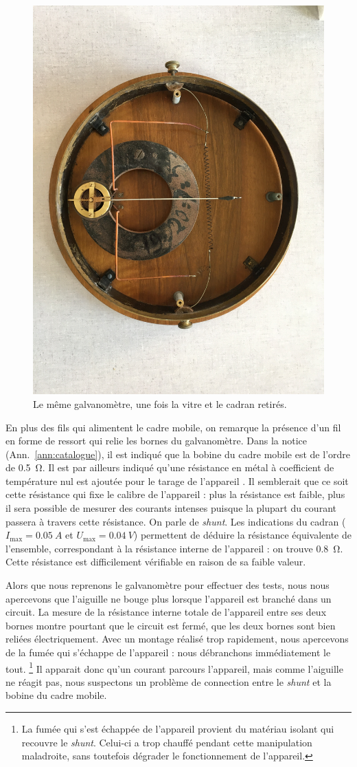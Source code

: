 \documentclass[12pt,a4paper,fleqn]{article}
\begin{document}
\begin{figure}[htbp]
    \center
    \includegraphics[height=300 pt, trim=500 100 600 200, clip]{images/IMG_4037.JPG}
    \caption{Le même galvanomètre, une fois la vitre et le cadran retirés.}
    \label{fig:galva_amp_int}
\end{figure}

En plus des fils qui alimentent le cadre mobile, on remarque la présence d'un fil en forme de ressort qui relie les bornes du galvanomètre.
Dans la notice (Ann.~\ref{ann:catalogue}), il est indiqué que la bobine du cadre mobile est de l'ordre de \SI{0.5}{\ohm}.
Il est par ailleurs indiqué qu'\og une résistance en métal à coefficient de température nul est ajoutée pour le tarage de l'appareil \fg{}.
Il semblerait que ce soit cette résistance qui fixe le calibre de l'appareil : plus la résistance est faible, plus il sera possible de mesurer des courants intenses puisque la plupart du courant passera à travers cette résistance.
On parle de \emph{shunt}.
Les indications du cadran ($I_\mathrm{max}=\SI{0.05}{A}$ et $U_\mathrm{max}=\SI{0.04}{V}$) permettent de déduire la résistance équivalente de l'ensemble, correspondant à la résistance interne de l'appareil : on trouve \SI{0.8}{\ohm}.
Cette résistance est difficilement vérifiable en raison de sa faible valeur.

Alors que nous reprenons le galvanomètre pour effectuer des tests, nous nous apercevons que l'aiguille ne bouge plus lorsque l'appareil est branché dans un circuit.
La mesure de la résistance interne totale de l'appareil entre ses deux bornes montre pourtant que le circuit est fermé, que les deux bornes sont bien reliées électriquement.
Avec un montage réalisé trop rapidement, nous apercevons de la fumée qui s'échappe de l'appareil : nous débranchons immédiatement le tout.
\footnote{La fumée qui s'est échappée de l'appareil provient du matériau isolant qui recouvre le \emph{shunt}.
Celui-ci a trop chauffé pendant cette manipulation maladroite, sans toutefois dégrader le fonctionnement de l'appareil.}
Il apparait donc qu'un courant parcours l'appareil, mais comme l'aiguille ne réagit pas, nous suspectons un problème de connection entre le \emph{shunt} et la bobine du cadre mobile.
\end{document}
